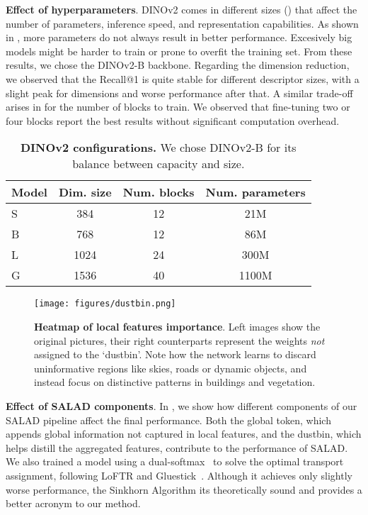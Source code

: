 \documentclass[10pt,twocolumn,letterpaper]{article}
\begin{document}
\textbf{Effect of hyperparameters}.
DINOv2 comes in different sizes () that affect the number of parameters, inference speed, and representation capabilities. As shown in , more parameters do not always result in better performance. Excesively big models might be harder to train or prone to overfit the training set. From these results, we chose the DINOv2-B backbone. Regarding the dimension reduction, we observed that the Recall@1 is quite stable for different descriptor sizes, with a slight peak for  dimensions and worse performance after that. A similar trade-off arises in  for the number of blocks to train. We observed that fine-tuning two or four blocks report the best results without significant computation overhead. 


\begin{table}
    \centering
    \small
    \begin{tabular}{l c c c}
    \hline

    \hline
    Model & Dim. size & Num. blocks & Num. parameters\\
    \hline
        S & 384 & 12 & 21M\\
        B & 768 & 12 & 86M\\
        L & 1024 & 24 & 300M\\
        G & 1536 & 40 & 1100M\\
    \hline

    \hline
    \end{tabular}
    \caption{\textbf{DINOv2 configurations.} We chose DINOv2-B for its balance between capacity and size.}
\label{tab:dinosizes}
\end{table}

\begin{figure*}
  \centering
   \texttt{[image: figures/dustbin.png]}
   \caption{\textbf{Heatmap of local features importance}. Left images show the original pictures, their right counterparts represent the weights \textit{not} assigned to the `dustbin'. Note how the network learns to discard uninformative regions like skies, roads or dynamic objects, and instead focus on distinctive patterns in buildings and vegetation.}
   \label{fig:dustbin}
\end{figure*}

\textbf{Effect of SALAD components}.
In , we show how different components of our SALAD pipeline affect the final performance. Both the global token, which appends global information not captured in local features, and the dustbin, which helps distill the aggregated features, contribute to the performance of SALAD. We also trained a model using a dual-softmax~\cite{rocco2018neighbourhood} to solve the optimal transport assignment, following  LoFTR and Gluestick~\cite{sun2021loftr, pautrat2023gluestick}. Although it achieves only slightly worse performance, the Sinkhorn Algorithm its theoretically sound and provides a better acronym to our method.
\end{document}
